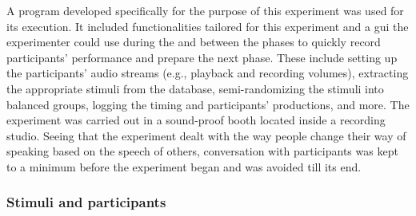 %
A program developed specifically for the purpose of this experiment was used for its execution.
It included functionalities tailored for this experiment and a \ac{gui} the experimenter could use during the and between the phases to quickly record participants' performance and prepare the next phase.
These include setting up the participants' audio streams (e.g., playback and recording volumes), extracting the appropriate stimuli from the database, semi-randomizing the stimuli into balanced groups, logging the timing and participants' productions, and more.
The experiment was carried out in a sound-proof booth located inside a recording studio.
Seeing that the experiment dealt with the way people change their way of speaking based on the speech of others, conversation with participants was kept to a minimum before the experiment began and was avoided till its end.

\subsubsection{Stimuli and participants}
\label{subsubsec:stimuli_participant_hci}

